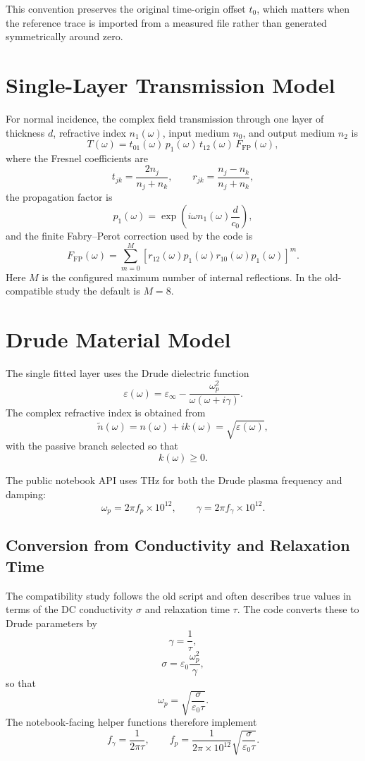\documentclass[11pt]{article}
\begin{document}
This convention preserves the original time-origin offset \(t_0\), which matters when the
reference trace is imported from a measured file rather than generated symmetrically around
zero.

\section{Single-Layer Transmission Model}
For normal incidence, the complex field transmission through one layer of thickness \(d\),
refractive index \(n_1(\omega)\), input medium \(n_0\), and output medium \(n_2\) is
\[
T(\omega)
= t_{01}(\omega)\,p_1(\omega)\,t_{12}(\omega)\,F_{\mathrm{FP}}(\omega),
\]
where the Fresnel coefficients are
\[
t_{jk} = \frac{2n_j}{n_j+n_k},
\qquad
r_{jk} = \frac{n_j-n_k}{n_j+n_k},
\]
the propagation factor is
\[
p_1(\omega) = \exp\!\left(i \omega n_1(\omega)\frac{d}{c_0}\right),
\]
and the finite Fabry--Perot correction used by the code is
\[
F_{\mathrm{FP}}(\omega)
= \sum_{m=0}^{M} \left[r_{12}(\omega)p_1(\omega)r_{10}(\omega)p_1(\omega)\right]^m.
\]
Here \(M\) is the configured maximum number of internal reflections. In the old-compatible
study the default is \(M=8\).

\section{Drude Material Model}
The single fitted layer uses the Drude dielectric function
\[
\varepsilon(\omega)
=
\varepsilon_\infty
- \frac{\omega_p^2}{\omega(\omega+i\gamma)}.
\]
The complex refractive index is obtained from
\[
\tilde{n}(\omega) = n(\omega) + i k(\omega) = \sqrt{\varepsilon(\omega)},
\]
with the passive branch selected so that
\[
k(\omega) \ge 0.
\]

The public notebook API uses \si{\tera\hertz} for both the Drude plasma frequency and damping:
\[
\omega_p = 2\pi f_p \times 10^{12},
\qquad
\gamma = 2\pi f_\gamma \times 10^{12}.
\]

\subsection{Conversion from Conductivity and Relaxation Time}
The compatibility study follows the old script and often describes true values in terms of the
DC conductivity \(\sigma\) and relaxation time \(\tau\). The code converts these to Drude
parameters by
\[
\gamma = \frac{1}{\tau},
\]
\[
\sigma = \varepsilon_0 \frac{\omega_p^2}{\gamma},
\]
so that
\[
\omega_p = \sqrt{\frac{\sigma}{\varepsilon_0 \tau}}.
\]
The notebook-facing helper functions therefore implement
\[
f_\gamma = \frac{1}{2\pi \tau},
\qquad
f_p = \frac{1}{2\pi \times 10^{12}}
\sqrt{\frac{\sigma}{\varepsilon_0 \tau}}.
\]
\end{document}
